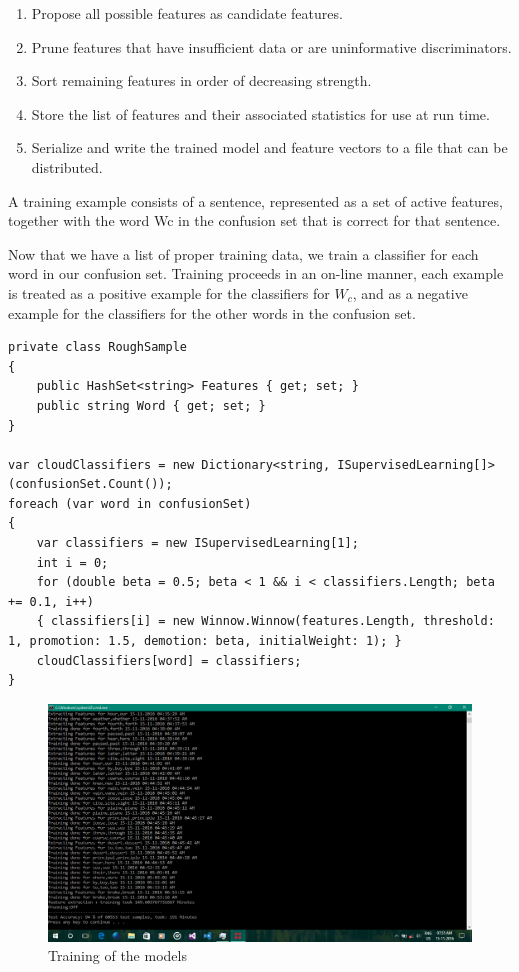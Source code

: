 

\begin{enumerate}
\item Propose all possible features as candidate features.
\item Prune features that have insufficient data or are uninformative discriminators.
\item Sort remaining features in order of decreasing strength.
\item Store the list of features and their associated statistics for use at run time.
\item Serialize and write the trained model and feature vectors to a file that can be distributed.
\end{enumerate}

A training example consists of a sentence, represented as a set of active
features, together with the word Wc in the confusion set that is correct for
that sentence.

Now that we have a list of proper training data, we train a classifier for each
word in our confusion set. Training proceeds in an on-line manner, each example
is treated as a positive example for the classifiers for \(W_c\), and as a negative
example for the classifiers for the other words in the confusion set.

\lstset{style=sharpc}
\begin{lstlisting}
private class RoughSample
{
    public HashSet<string> Features { get; set; }
    public string Word { get; set; }
}

var cloudClassifiers = new Dictionary<string, ISupervisedLearning[]>(confusionSet.Count());
foreach (var word in confusionSet)
{
    var classifiers = new ISupervisedLearning[1];
    int i = 0;
    for (double beta = 0.5; beta < 1 && i < classifiers.Length; beta += 0.1, i++)
    { classifiers[i] = new Winnow.Winnow(features.Length, threshold: 1, promotion: 1.5, demotion: beta, initialWeight: 1); }
    cloudClassifiers[word] = classifiers;
}
\end{lstlisting}

\begin{figure}[H]
    \centering
    \caption{Training of the models}
    \includegraphics[width=130mm]{img/train.png}
\end{figure}

